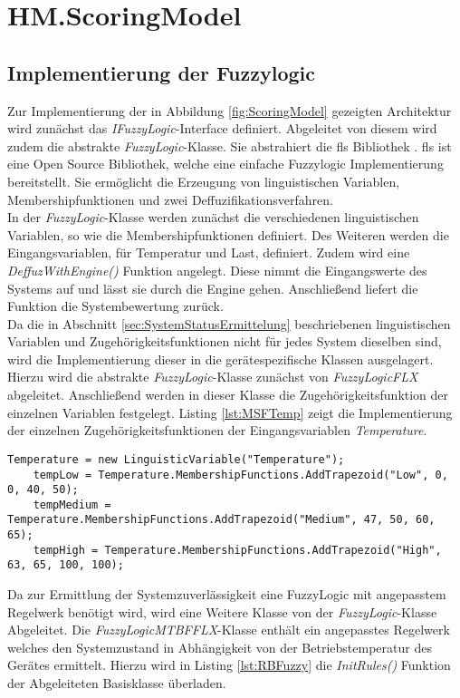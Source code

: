\section{HM.ScoringModel}
\subsection{Implementierung der Fuzzylogic}
Zur Implementierung der in Abbildung \ref{fig:ScoringModel} gezeigten Architektur wird zunächst das \textit{IFuzzyLogic}-Interface definiert. Abgeleitet von diesem wird zudem die abstrakte \textit{FuzzyLogic}-Klasse. Sie abstrahiert die \ac{fls} Bibliothek \cite{FLSGit}. \ac{fls} ist eine Open Source Bibliothek, welche eine einfache Fuzzylogic Implementierung bereitstellt. Sie ermöglicht die Erzeugung von linguistischen Variablen, Membershipfunktionen und zwei Deffuzifikationsverfahren.\\
In der \textit{FuzzyLogic}-Klasse werden zunächst die verschiedenen linguistischen Variablen, so wie die Membershipfunktionen definiert. Des Weiteren werden die Eingangsvariablen, für Temperatur und Last, definiert. 
Zudem wird eine \textit{DeffuzWithEngine()} Funktion angelegt. Diese nimmt die Eingangswerte des Systems auf und lässt sie durch die Engine gehen. Anschließend liefert die Funktion die Systembewertung zurück.\\
Da die in Abschnitt \ref{sec:SystemStatusErmittelung} beschriebenen linguistischen Variablen und Zugehörigkeitsfunktionen nicht für jedes System dieselben sind, wird die Implementierung dieser in die gerätespezifische Klassen ausgelagert. Hierzu wird die abstrakte \textit{FuzzyLogic}-Klasse zunächst von \textit{FuzzyLogicFLX} abgeleitet. Anschließend werden in dieser Klasse die Zugehörigkeitsfunktion der einzelnen Variablen festgelegt. Listing \ref{lst:MSFTemp} zeigt die Implementierung der einzelnen Zugehörigkeitsfunktionen der Eingangsvariablen \textit{Temperature}.\\
\begin{lstlisting}[caption={Implementierung der Zugehörigkeitsfunktionen zur Eingangsvariable \textit{Temperature}}, label={lst:MSFTemp}]
    Temperature = new LinguisticVariable("Temperature");
    tempLow = Temperature.MembershipFunctions.AddTrapezoid("Low", 0, 0, 40, 50);
    tempMedium = Temperature.MembershipFunctions.AddTrapezoid("Medium", 47, 50, 60, 65);
    tempHigh = Temperature.MembershipFunctions.AddTrapezoid("High", 63, 65, 100, 100);
\end{lstlisting}
Da zur Ermittlung der Systemzuverlässigkeit eine FuzzyLogic mit angepasstem Regelwerk benötigt wird, wird eine Weitere Klasse von der \textit{FuzzyLogic}-Klasse Abgeleitet. Die \textit{FuzzyLogicMTBFFLX}-Klasse enthält ein angepasstes Regelwerk welches den Systemzustand in Abhängigkeit von der Betriebstemperatur des Gerätes ermittelt. Hierzu wird in Listing \ref{lst:RBFuzzy} die \textit{InitRules()} Funktion der Abgeleiteten Basisklasse überladen. 
